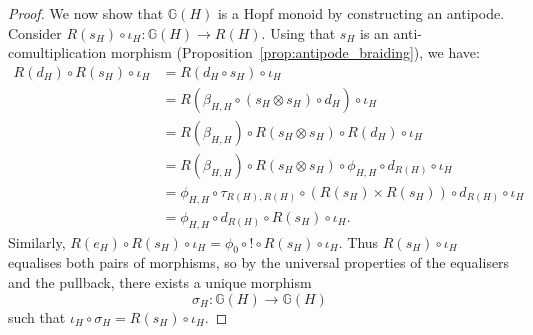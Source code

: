 \documentclass{amsart}
\begin{document}
\begin{proof}
We now show that $\mathbb{G}(H)$ is a Hopf monoid by constructing an antipode. Consider $R(s_H) \circ \iota_H \colon \mathbb{G}(H) \longrightarrow R(H)$. Using that $s_H$ is an anti-comultiplication morphism (Proposition~\ref{prop:antipode_braiding}), we have:
\begin{align*}
R(d_H) \circ R(s_H) \circ \iota_H
&= R(d_H \circ s_H) \circ \iota_H \\
&= R(\beta_{H,H} \circ (s_H \otimes s_H) \circ d_H) \circ \iota_H \\
&= R(\beta_{H,H}) \circ R(s_H \otimes s_H) \circ R(d_H) \circ \iota_H \\
&= R(\beta_{H,H}) \circ R(s_H \otimes s_H) \circ \phi_{H,H} \circ d_{R(H)} \circ \iota_H \\
&= \phi_{H,H} \circ \tau_{R(H),R(H)} \circ (R(s_H) \times R(s_H)) \circ d_{R(H)} \circ \iota_H \\
&= \phi_{H,H} \circ d_{R(H)} \circ R(s_H) \circ \iota_H.
\end{align*}
Similarly, $R(e_H) \circ R(s_H) \circ \iota_H = \phi_0 \circ ! \circ R(s_H) \circ \iota_H$. Thus $R(s_H) \circ \iota_H$ equalises both pairs of morphisms, so by the universal properties of the equalisers and the pullback, there exists a unique morphism
\[
\sigma_H \colon \mathbb{G}(H) \longrightarrow \mathbb{G}(H)
\]
such that $\iota_H \circ \sigma_H = R(s_H) \circ \iota_H$.


\end{proof}
\end{document}
